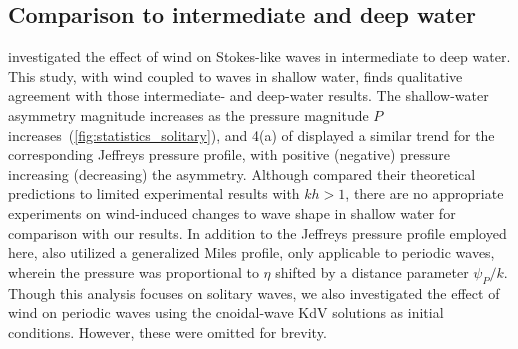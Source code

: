 \documentclass{jfm}
\begin{document}
\subsection{Comparison to intermediate and deep water}
 investigated the effect of
wind on Stokes-like waves in intermediate to deep water.
This study, with wind coupled to waves in shallow water, finds
qualitative agreement with those intermediate- and deep-water results.
The shallow-water asymmetry magnitude increases as the pressure
magnitude $P$ increases~(\cref{fig:statistics_solitary}), and \figname{}
4(a) of \citet{zdyrski2020wind} displayed a similar trend for the
corresponding Jeffreys pressure profile, with positive (negative)
pressure increasing (decreasing) the asymmetry.
Although \citet{zdyrski2020wind} compared their theoretical
predictions to limited experimental results with $kh > 1$, there are no
appropriate experiments on wind-induced changes to wave shape in shallow
water for comparison with our results.
In addition to the Jeffreys pressure profile employed here,
\citet{zdyrski2020wind} also utilized a generalized Miles profile,
only applicable to periodic waves, wherein the pressure was proportional
to $\eta$ shifted by a distance parameter $\psi_P/k$.
Though this analysis focuses on solitary waves, we also investigated the
effect of wind on periodic waves using the cnoidal-wave KdV solutions as
initial conditions.
However, these were omitted for brevity.
\end{document}
